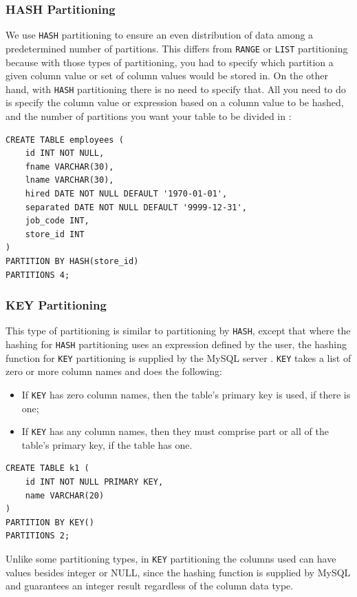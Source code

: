 \documentclass[12pt]{article}
\begin{document}
\subsubsection{HASH Partitioning}
We use \verb|HASH| partitioning to ensure an even distribution of data among a predetermined number of partitions. This differs from \verb|RANGE| or \verb|LIST| partitioning because with those types of partitioning, you had to specify which partition a given column value or set of column values would be stored in. On the other hand, with \verb|HASH| partitioning there is no need to specify that. All you need to do is specify the column value or expression based on a column value to be hashed, and the number of partitions you want your table to be divided in \parencite{PARTITIONING_HASH}:

\begin{verbatim}
CREATE TABLE employees (
    id INT NOT NULL,
    fname VARCHAR(30),
    lname VARCHAR(30),
    hired DATE NOT NULL DEFAULT '1970-01-01',
    separated DATE NOT NULL DEFAULT '9999-12-31',
    job_code INT,
    store_id INT
)
PARTITION BY HASH(store_id)
PARTITIONS 4;
\end{verbatim}
    
\subsubsection{KEY Partitioning}
This type of partitioning is similar to partitioning by \verb|HASH|, except that where the hashing for \verb|HASH| partitioning uses an expression defined by the user, the hashing function for \verb|KEY| partitioning is supplied by the MySQL server \parencite{PARTITIONING_KEY}. \verb|KEY| takes a list of zero or more column names and does the following:
\begin{itemize}
    \item If \verb|KEY| has zero column names, then the table's primary key is used, if there is one;
    \item If \verb|KEY| has any column names, then they must comprise part or all of the table's primary key, if the table has one.
\end{itemize}
 
\begin{verbatim}
CREATE TABLE k1 (
    id INT NOT NULL PRIMARY KEY,
    name VARCHAR(20)
)
PARTITION BY KEY()
PARTITIONS 2;
\end{verbatim}

Unlike some partitioning types, in \verb|KEY| partitioning the columns used can have values besides integer or NULL, since the hashing function is supplied by MySQL and guarantees an integer result regardless of the column data type.
\end{document}
